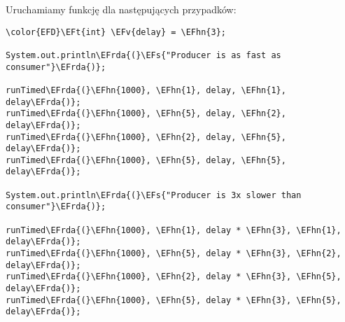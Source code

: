 \documentclass[11pt]{article}
\newcommand{\EFs}[1]{\textcolor{EFs}{#1}} %
\newcommand{\EFv}[1]{\textcolor{EFv}{#1}} %
\newcommand{\EFt}[1]{\textcolor{EFt}{#1}} %
\newcommand{\EFhn}[1]{\textcolor{EFhn}{#1}} %
\newcommand{\EFrda}[1]{#1} %
\begin{document}
Uruchamiamy funkcję dla następujących przypadków:
\begin{Code}
\begin{Verbatim}
\color{EFD}\EFt{int} \EFv{delay} = \EFhn{3};

System.out.println\EFrda{(}\EFs{"Producer is as fast as consumer"}\EFrda{)};

runTimed\EFrda{(}\EFhn{1000}, \EFhn{1}, delay, \EFhn{1}, delay\EFrda{)};
runTimed\EFrda{(}\EFhn{1000}, \EFhn{5}, delay, \EFhn{2}, delay\EFrda{)};
runTimed\EFrda{(}\EFhn{1000}, \EFhn{2}, delay, \EFhn{5}, delay\EFrda{)};
runTimed\EFrda{(}\EFhn{1000}, \EFhn{5}, delay, \EFhn{5}, delay\EFrda{)};

System.out.println\EFrda{(}\EFs{"Producer is 3x slower than consumer"}\EFrda{)};

runTimed\EFrda{(}\EFhn{1000}, \EFhn{1}, delay * \EFhn{3}, \EFhn{1}, delay\EFrda{)};
runTimed\EFrda{(}\EFhn{1000}, \EFhn{5}, delay * \EFhn{3}, \EFhn{2}, delay\EFrda{)};
runTimed\EFrda{(}\EFhn{1000}, \EFhn{2}, delay * \EFhn{3}, \EFhn{5}, delay\EFrda{)};
runTimed\EFrda{(}\EFhn{1000}, \EFhn{5}, delay * \EFhn{3}, \EFhn{5}, delay\EFrda{)};
\end{Verbatim}
\end{Code}
\end{document}
